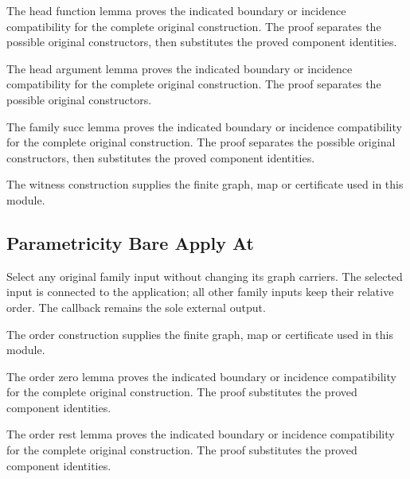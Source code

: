 The head function lemma proves the indicated boundary or incidence compatibility for the complete original construction.
The proof separates the possible original constructors, then substitutes the proved component identities.
\par{}

The head argument lemma proves the indicated boundary or incidence compatibility for the complete original construction.
The proof separates the possible original constructors.
\par{}

The family succ lemma proves the indicated boundary or incidence compatibility for the complete original construction.
The proof separates the possible original constructors, then substitutes the proved component identities.
\par{}

The witness construction supplies the finite graph, map or certificate used in this module.
\par{}

\subsection{Parametricity Bare Apply At}
Select any original family input without changing its graph carriers.
The selected input is connected to the application; all other family inputs
keep their relative order. The callback remains the sole external output.

The order construction supplies the finite graph, map or certificate used in this module.
\par{}

The order zero lemma proves the indicated boundary or incidence compatibility for the complete original construction.
The proof substitutes the proved component identities.
\par{}

The order rest lemma proves the indicated boundary or incidence compatibility for the complete original construction.
The proof substitutes the proved component identities.
\par{}

